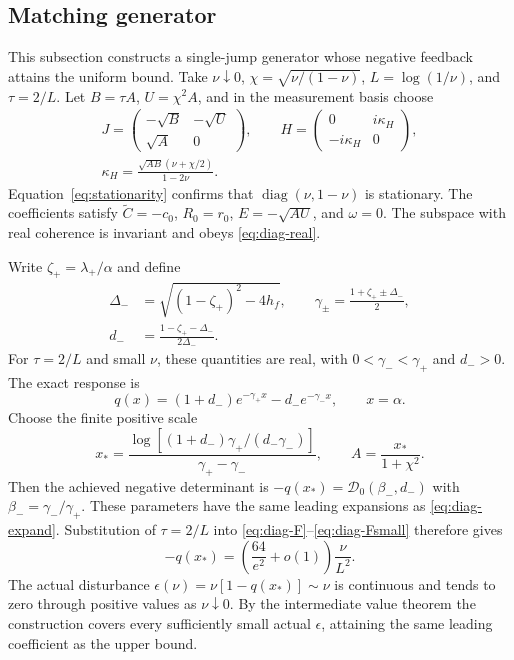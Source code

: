 \documentclass[aps,pra,reprint,amsmath,amssymb,nofootinbib,floatfix,longbibliography]{revtex4-2}
\theoremstyle{aps}
\DeclareMathOperator{\diag}{diag}
\newcommand{\eps}{\epsilon}
\begin{document}
\subsection{Matching generator}

This subsection constructs a single-jump generator whose negative feedback attains the uniform bound. Take $\nu\downarrow0$, $\chi=\sqrt{\nu/(1-\nu)}$, $L=\log(1/\nu)$, and $\tau=2/L$. Let $B=\tau A$, $U=\chi^2A$, and in the measurement basis choose
\begin{equation}\label{eq:diag-jump}
 \begin{gathered}
 J=\begin{pmatrix}-\sqrt B&-\sqrt U\\\sqrt A&0\end{pmatrix},\qquad
 H=\begin{pmatrix}0&i\kappa_H\\-i\kappa_H&0\end{pmatrix},\\
 \kappa_H=\frac{\sqrt{AB}(\nu+\chi/2)}{1-2\nu}.
 \end{gathered}
\end{equation}
Equation~\eqref{eq:stationarity} confirms that $\diag(\nu,1-\nu)$ is stationary. The coefficients satisfy
$\widetilde C=-c_0$, $R_0=r_0$, $E=-\sqrt{AU}$, and $\omega=0$. The subspace with real coherence is invariant and obeys \eqref{eq:diag-real}.

Write $\zeta_+=\lambda_+/\alpha$ and define
\begin{equation}\label{eq:diag-negative-spectrum}
 \begin{split}
 \Delta_-&=\sqrt{(1-\zeta_+)^2-4h_f},\qquad
 \gamma_\pm=\frac{1+\zeta_+\pm\Delta_-}{2},\\
 d_-&=\frac{1-\zeta_+-\Delta_-}{2\Delta_-}.
 \end{split}
\end{equation}
For $\tau=2/L$ and small $\nu$, these quantities are real, with $0<\gamma_-<\gamma_+$ and $d_->0$. The exact response is
\begin{equation}\label{eq:diag-qexact}
 q(x)=(1+d_-)e^{-\gamma_+x}-d_-e^{-\gamma_-x},\qquad x=\alpha.
\end{equation}
Choose the finite positive scale
\begin{equation}\label{eq:diag-xstar}
 x_*=\frac{\log[(1+d_-)\gamma_+/(d_-\gamma_-)]}
 {\gamma_+-\gamma_-},\qquad A=\frac{x_*}{1+\chi^2}.
\end{equation}
Then the achieved negative determinant is
$-q(x_*)=\mathcal D_0(\beta_-,d_-)$ with $\beta_-=\gamma_-/\gamma_+$. These parameters have the same leading expansions as \eqref{eq:diag-expand}. Substitution of $\tau=2/L$ into \eqref{eq:diag-F}--\eqref{eq:diag-Fsmall} therefore gives
\begin{equation}\label{eq:diag-lower}
 -q(x_*)=\left(\frac{64}{e^2}+o(1)\right)\frac\nu{L^2}.
\end{equation}
The actual disturbance $\eps(\nu)=\nu[1-q(x_*)]\sim\nu$ is continuous and tends to zero through positive values as $\nu\downarrow0$. By the intermediate value theorem the construction covers every sufficiently small actual $\eps$, attaining the same leading coefficient as the upper bound.
\end{document}
